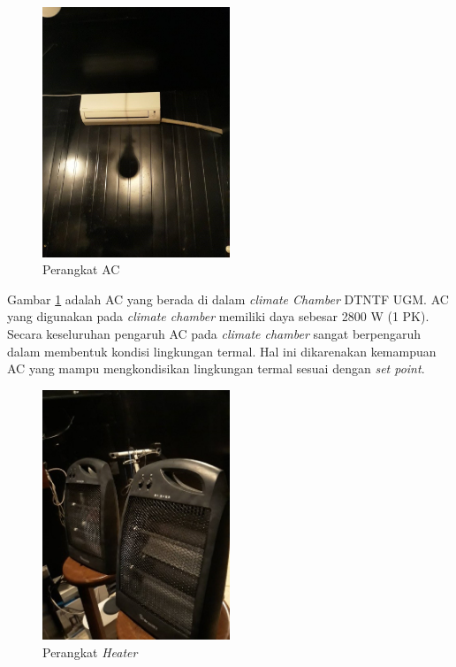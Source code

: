 \begin{figure}[h]
	\centering
	\includegraphics[width=0.5\textwidth]{figures/AC}
	\caption{Perangkat AC}
	\label{fig:5:AC}
\end{figure}

Gambar \ref{fig:5:AC} adalah AC yang berada di dalam \textit{climate Chamber} DTNTF UGM. AC yang digunakan pada \textit{climate chamber} memiliki daya sebesar 2800 W (1 PK). Secara keseluruhan pengaruh AC pada \textit{climate chamber} sangat berpengaruh dalam membentuk kondisi lingkungan termal. Hal ini dikarenakan kemampuan AC yang mampu mengkondisikan lingkungan termal sesuai dengan \textit{set point}.

\begin{figure}[h]
	\centering
	\includegraphics[width=0.5\textwidth]{figures/Heater}
	\caption{Perangkat \textit{Heater}}
	\label{fig:5:Heater}
\end{figure}

